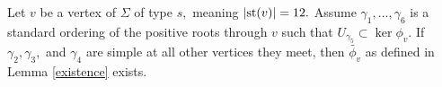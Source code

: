 \documentclass[class=book, crop=false]{standalone}
\begin{document}
%
%
\begin{lemma} 
	\label{336f2existence}
	Let $v$ be a vertex of $\Sigma$ of type $s,$ meaning $|\mathrm{st}(v)|=12.$ Assume $\gamma_1,\dots,\gamma_6$ is a standard ordering of the positive roots through $v$ such that $U_{\gamma_5}\subset \ker \phi_v.$ If $\gamma_2,\gamma_3,$ and $\gamma_4$ are simple at all other vertices they meet, then $\tilde{\phi_v}$ as defined in Lemma \ref{existence} exists.
\end{lemma}
\end{document}
